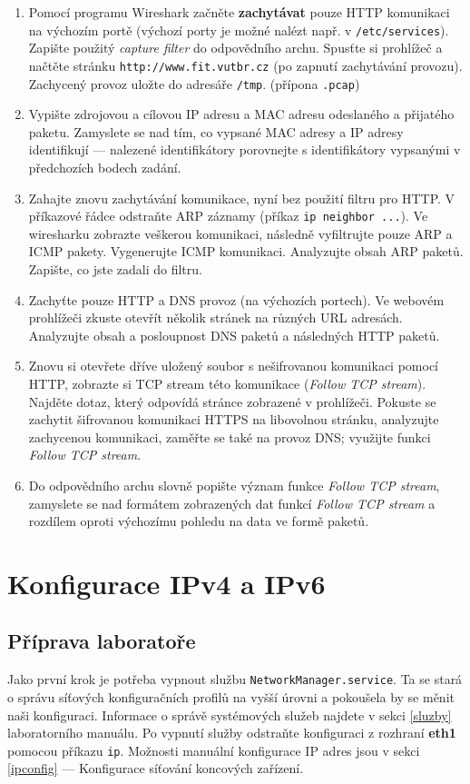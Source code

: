 \begin{enumerate}
  \item Pomocí programu Wireshark začněte \textbf{zachytávat} pouze HTTP komunikaci na výchozím portě
    (výchozí porty je možné nalézt např. v \texttt{/etc/services}). Zapište
    použitý \emph{capture filter} do odpovědního archu. Spusťte si prohlížeč a
    načtěte stránku \texttt{http://www.fit.vutbr.cz} (po zapnutí zachytávání
    provozu). Zachycený provoz uložte do adresáře \texttt{/tmp}. (přípona \texttt{.pcap})
\item Vypište zdrojovou a cílovou IP adresu a MAC adresu odeslaného a
  přijatého paketu. Zamyslete se nad tím, co vypsané MAC adresy a IP adresy
    identifikují --- nalezené identifikátory porovnejte s identifikátory
    vypsanými v předchozích bodech zadání.
\item Zahajte znovu zachytávání komunikace, nyní bez použití filtru pro HTTP. V příkazové řádce odstraňte ARP záznamy (příkaz \texttt{ip neighbor ...}). Ve wiresharku zobrazte veškerou komunikaci, následně vyfiltrujte pouze ARP a ICMP pakety. Vygenerujte ICMP komunikaci. Analyzujte obsah ARP paketů. Zapište, co jste zadali do filtru.
\item Zachyťte pouze HTTP a DNS provoz (na výchozích portech). Ve webovém prohlížeči zkuste otevřít několik stránek na různých URL adresách. Analyzujte obsah a posloupnost DNS paketů a následných HTTP paketů.
\item Znovu si otevřete dříve uložený soubor s nešifrovanou komunikaci pomocí
  HTTP, zobrazte si TCP stream této komunikace (\emph{Follow TCP stream}).
    Najděte dotaz, který odpovídá stránce zobrazené v prohlížeči. Pokuste se
    zachytit šifrovanou komunikaci HTTPS na libovolnou stránku, analyzujte
    zachycenou komunikaci, zaměřte se také na provoz DNS; využijte funkci \emph{Follow TCP stream}.
\item Do odpovědního archu slovně popište význam funkce \emph{Follow TCP stream},
    zamyslete se nad formátem zobrazených dat funkcí \emph{Follow TCP stream} a
    rozdílem oproti výchozímu pohledu na data ve formě paketů.
\end{enumerate}

\section{Konfigurace IPv4 a IPv6}

\subsection{Příprava laboratoře}
Jako první krok je potřeba vypnout službu \texttt{NetworkManager.service}.
Ta se stará o správu síťových konfiguračních profilů na vyšší úrovni a pokoušela by se měnit naši konfiguraci.
Informace o správě systémových služeb najdete v sekci \ref{sluzby} laboratorního manuálu.
Po vypnutí služby odstraňte konfiguraci z rozhraní \textbf{eth1} pomocou příkazu \texttt{ip}.
Možnosti manuální konfigurace IP adres jsou v sekci \ref{ipconfig} --- Konfigurace síťování koncových zařízení.

